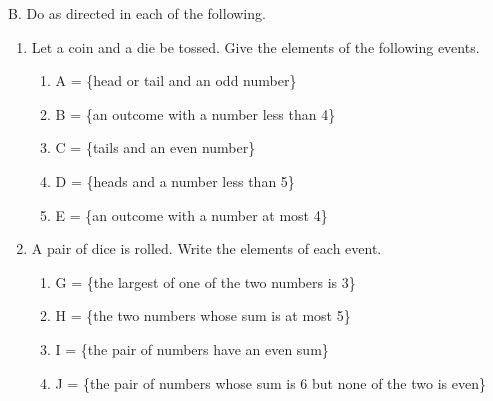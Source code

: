 B. Do as directed in each of the following. 
\begin{enumerate}[label = \arabic*. ]
\item Let a coin and a die be tossed. Give the elements of the following events. 
\begin{enumerate}[label = \alph*. ]
\item A = \{head or tail and an odd number\}
\item B = \{an outcome with a number less than 4\}
\item C = \{tails and an even number\}
\item D = \{heads and a number less than 5\}
\item E = \{an outcome with a number at most 4\}
\end{enumerate}  
\item A pair of dice is rolled. Write the elements of each event. 
\begin{enumerate}[label = \alph*. ]
\item G = \{the largest of one of the two numbers is 3\}
\item H = \{the two numbers whose sum is at most 5\}
\item I = \{the pair of numbers have an even sum\}
\item J = \{the pair of numbers whose sum is 6 but none of the two is even\}
\end{enumerate}  

\end{enumerate}  